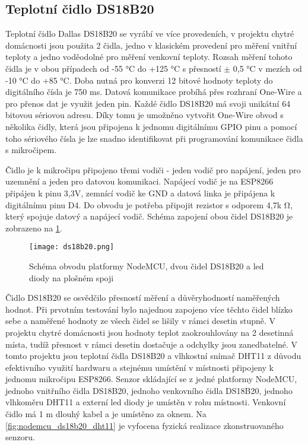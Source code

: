 \subsection{Teplotní čidlo DS18B20}
Teplotní čidlo Dallas DS18B20 \cite{DS18B20:Datasheet} se vyrábí ve více provedeních, v projektu chytré domácnosti jsou použita 2 čidla, jedno v klasickém provedení pro měření vnitřní teploty a jedno voděodolné pro měření venkovní teploty. Rozsah měření tohoto čidla je v obou případech od -55 \si{\degree}C do +125 \si{\degree}C s přesností $\pm$ 0,5 \si{\degree}C v mezích od -10 \si{\degree}C do +85 \si{\degree}C. Doba nutná pro konverzi 12 bitové hodnoty teploty do digitálního čísla je 750 ms. Datová komunikace probíhá přes rozhraní One-Wire a pro přenos dat je využit jeden pin. Každé čidlo DS18B20 má svoji unikátní 64 bitovou sériovou adresu. Díky tomu je umožněno vytvořit One-Wire obvod s několika čidly, která jsou připojena k jednomu digitálnímu GPIO pinu a pomocí toho sériového čísla je lze snadno identifikovat při programování komunikace čidla s mikročipem. \par 
Čidlo je k mikročipu připojeno třemi vodiči - jeden vodič pro napájení, jeden pro uzemnění a jeden pro datovou komunikaci. Napájecí vodič je na ESP8266 připájen k pinu 3,3V, zemnící vodič ke GND a datová linka je připájena k digitálnímu pinu D4. Do obvodu je potřeba připojit rezistor s odporem 4,7k \si{\ohm}, který spojuje datový a napájecí vodič. Schéma zapojení obou čidel DS18B20 je zobrazeno na \cref{fig:schema_esp_ds18b20}.\par

\begin{figure}[H]
  \centering
  \texttt{[image: ds18b20.png]}
  \caption{Schéma obvodu platformy NodeMCU, dvou čidel DS18B20 a led diody na plošném spoji}
  \label{fig:schema_esp_ds18b20}
\end{figure}

Čidlo DS18B20 se osvědčilo přesností měření a důvěryhodností naměřených hodnot. Při prvotním testování bylo najednou zapojeno více těchto čidel blízko sebe a naměřené hodnoty ze všech čidel se lišily v rámci desetin stupně. V projektu chytré domácnosti jsou hodnoty teplot zaokrouhlovány na 2 desetinná místa, tudíž přesnost v rámci desetin dostačuje a odchylky jsou zanedbatelné. V tomto projektu jsou teplotní čidla DS18B20 a vlhkostní snímač DHT11 z důvodu efektivního využití hardwaru a stejnému umístění v místnosti připojeny k jednomu mikročipu ESP8266. Senzor skládající se z jedné platformy NodeMCU, jednoho vnitřního čidla DS18B20, jednoho venkovního čidla DS18B20, jednoho vlhkoměru DHT11 a externí led diody je umístěn v rohu místnosti. Venkovní čidlo má 1 m dlouhý kabel a je umístěno za oknem. Na \cref{fig:nodemcu_ds18b20_dht11} je vyfocena fyzická realizace zkonstruovaného senzoru.

